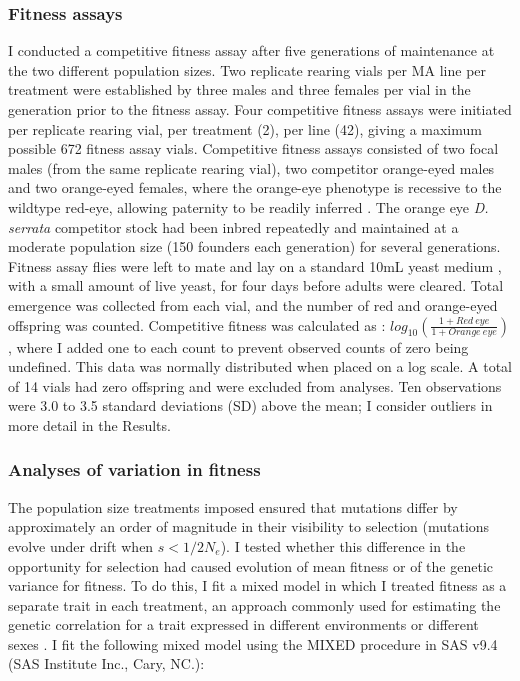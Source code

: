 \subsubsection{Fitness assays} 
I conducted a competitive fitness assay after five generations of maintenance at the two different population sizes. Two replicate rearing vials per MA line per treatment were established by three males and three females per vial in the generation prior to the fitness assay. Four competitive fitness assays were initiated per replicate rearing vial, per treatment (2), per line (42), giving a maximum possible 672 fitness assay vials. Competitive fitness assays consisted of two focal males (from the same replicate rearing vial), two competitor orange-eyed males and two orange-eyed females, where the orange-eye phenotype is recessive to the wildtype red-eye, allowing paternity to be readily inferred \citep{Alle17}. The orange eye \textit{D. serrata} competitor stock had been inbred repeatedly and maintained at a moderate population size (150 founders each generation) for several generations. Fitness assay flies were left to mate and lay on a standard 10mL yeast medium \citep{Rund05}, with a small amount of live yeast, for four days before adults were cleared. Total emergence was collected from each vial, and the number of red and orange-eyed offspring was counted. Competitive fitness was calculated as \citep{Alle17}: 
$log_{10}(\frac{1+Red\ eye}{1+Orange\ eye})$, where I added one to each count to prevent observed counts of zero being undefined. This data was normally distributed when placed on a log scale. A total of 14 vials had zero offspring and were excluded from analyses. Ten observations were 3.0 to 3.5 standard deviations (SD) above the mean; I consider outliers in more detail in the Results.\par

\subsubsection{Analyses of variation in fitness}
The population size treatments imposed ensured that mutations differ by approximately an order of magnitude in their visibility to selection (mutations evolve under drift when $s < 1/2N_e$). I tested whether this difference in the opportunity for selection had caused evolution of mean fitness or of the genetic variance for fitness. To do this, I fit a mixed model in which I treated fitness as a separate trait in each treatment, an approach commonly used for estimating the genetic correlation for a trait expressed in different environments \citep{Falc96} or different sexes \citep{Alle17}. I fit the following mixed model using the MIXED procedure in SAS v9.4 (SAS Institute Inc., Cary, NC.):

